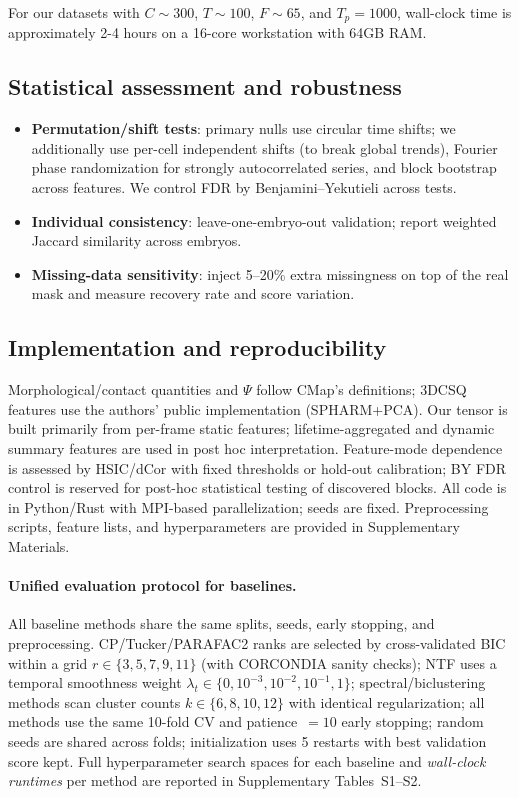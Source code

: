 \documentclass[unnumsec,webpdf,modern,large,namedate]{oup-authoring-template}%
\theoremstyle{thmstyleone}\newtheorem{theorem}{Theorem}
\theoremstyle{thmstyletwo}\newtheorem{example}{Example}
\theoremstyle{thmstylethree}\newtheorem{definition}{Definition}
\begin{document}
For our datasets with $C \sim 300$, $T \sim 100$, $F \sim 65$, and $T_p = 1000$, wall-clock time is approximately 2-4 hours on a 16-core workstation with 64GB RAM.

\subsection{Statistical assessment and robustness}
\begin{itemize}
    \item \textbf{Permutation/shift tests}: primary nulls use circular time shifts; we additionally use per-cell independent shifts (to break global trends), Fourier phase randomization for strongly autocorrelated series, and block bootstrap across features. We control FDR by Benjamini--Yekutieli across tests.
    \item \textbf{Individual consistency}: leave-one-embryo-out validation; report weighted Jaccard similarity across embryos.
    \item \textbf{Missing-data sensitivity}: inject 5--20\% extra missingness on top of the real mask and measure recovery rate and score variation.
\end{itemize}

\subsection{Implementation and reproducibility}
Morphological/contact quantities and $\Psi$ follow CMap's definitions; 3DCSQ features use the authors' public implementation (SPHARM+PCA). Our tensor is built primarily from per-frame static features; lifetime-aggregated and dynamic summary features are used in post hoc interpretation. Feature-mode dependence is assessed by HSIC/dCor with fixed thresholds or hold-out calibration; BY FDR control is reserved for post-hoc statistical testing of discovered blocks. All code is in Python/Rust with MPI-based parallelization; seeds are fixed. Preprocessing scripts, feature lists, and hyperparameters are provided in Supplementary Materials.

\paragraph{Unified evaluation protocol for baselines.} All baseline methods share the same splits, seeds, early stopping, and preprocessing. CP/Tucker/PARAFAC2 ranks are selected by cross-validated BIC within a grid $r\in\{3,5,7,9,11\}$ (with CORCONDIA sanity checks); NTF uses a temporal smoothness weight $\lambda_t\in\{0,10^{-3},10^{-2},10^{-1},1\}$; spectral/biclustering methods scan cluster counts $k\in\{6,8,10,12\}$ with identical regularization; all methods use the same 10-fold CV and patience~$=10$ early stopping; random seeds are shared across folds; initialization uses 5 restarts with best validation score kept. Full hyperparameter search spaces for each baseline and \emph{wall-clock runtimes} per method are reported in Supplementary Tables~S1--S2.
\end{document}
